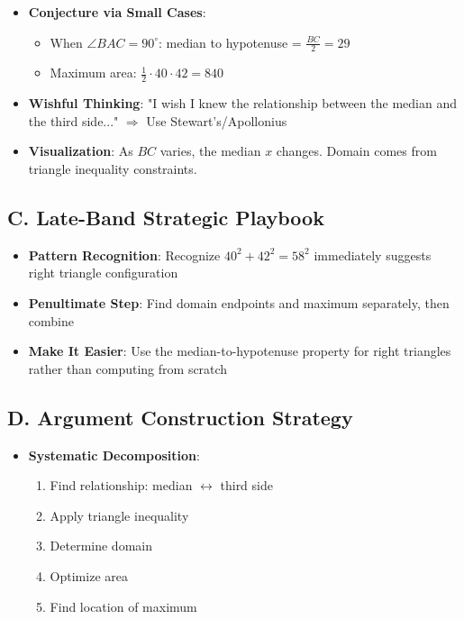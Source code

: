 \documentclass[12pt]{article}
\begin{document}
\begin{strategicbox}
\begin{itemize}[leftmargin=*]
    \item \textbf{Conjecture via Small Cases}: 
    \begin{itemize}
        \item When $\angle BAC = 90^{\circ}$: median to hypotenuse = $\frac{BC}{2} = 29$
        \item Maximum area: $\frac{1}{2} \cdot 40 \cdot 42 = 840$
    \end{itemize}
    
    \item \textbf{Wishful Thinking}: "I wish I knew the relationship between the median and the third side..." $\Rightarrow$ Use Stewart's/Apollonius
    
    \item \textbf{Visualization}: As $BC$ varies, the median $x$ changes. Domain comes from triangle inequality constraints.
\end{itemize}

\subsection*{C. Late-Band Strategic Playbook}
\begin{itemize}[leftmargin=*]
    \item \textbf{Pattern Recognition}: Recognize $40^2 + 42^2 = 58^2$ immediately suggests right triangle configuration
    
    \item \textbf{Penultimate Step}: Find domain endpoints and maximum separately, then combine
    
    \item \textbf{Make It Easier}: Use the median-to-hypotenuse property for right triangles rather than computing from scratch
\end{itemize}

\subsection*{D. Argument Construction Strategy}
\begin{itemize}[leftmargin=*]
    \item \textbf{Systematic Decomposition}: 
    \begin{enumerate}
        \item Find relationship: median $\leftrightarrow$ third side
        \item Apply triangle inequality
        \item Determine domain
        \item Optimize area
        \item Find location of maximum
    \end{enumerate}
    

\end{itemize}
\end{strategicbox}
\end{document}
